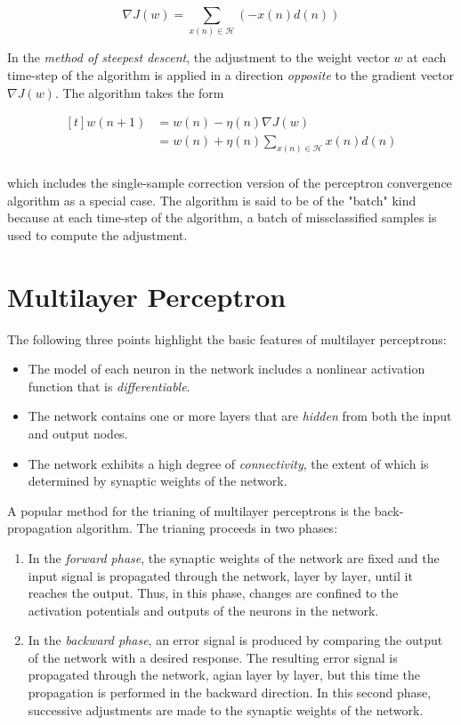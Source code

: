 \documentclass[twocolumn]{article}
\begin{document}
	 $$ \nabla J(w) = \sum_{x(n) \in \mathcal{H}} (-x(n)d(n)) $$

	 In the \textit{method of steepest descent}, the adjustment to the weight vector $ w $ at each time-step of the algorithm is applied in a direction \textit{opposite} to the gradient vector $ \nabla J(w) $. The algorithm takes the form

	 $$ \begin{aligned}[t]
			 w(n+1) & = w(n) - \eta (n) \nabla J(w)                           \\
			        & = w(n) + \eta (n) \sum_{x(n) \in \mathcal{H}} x(n) d(n) \\
		 \end{aligned} $$

	 \noindent which includes the single-sample correction version of the perceptron convergence algorithm as a special case. The algorithm is said to be of the "batch" kind because at each time-step of the algorithm, a batch of missclassified samples is used to compute the adjustment.

\section{Multilayer Perceptron}

 The following three points highlight the basic features of multilayer perceptrons:

 \begin{itemize}
	 \item The model of each neuron in the network includes a nonlinear activation function that is \textit{differentiable}.
	 \item The network contains one or more layers that are \textit{hidden} from both the input and output nodes.
	 \item The network exhibits a high degree of \textit{connectivity}, the extent of which is determined by synaptic weights of the network.
 \end{itemize}

 A popular method for the trianing of multilayer perceptrons is the back-propagation algorithm. The trianing proceeds in two phases:
 \begin{enumerate}
	 \item In the \textit{forward phase}, the synaptic weights of the network are fixed and the input signal is propagated through the network, layer by layer, until it reaches the output. Thus, in this phase, changes are confined to the activation potentials and outputs of the neurons in the network.
	 \item In the \textit{backward phase}, an error signal is produced by comparing the output of the network with a desired response. The resulting error signal is propagated through the network, agian layer by layer, but this time the propagation is performed in the backward direction. In this second phase, successive adjustments are made to the synaptic weights of the network.
 \end{enumerate}
\end{document}
